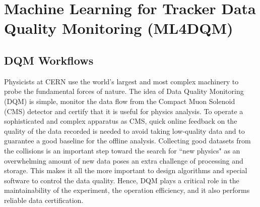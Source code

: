 \chapter{Machine Learning for Tracker Data Quality Monitoring (ML4DQM) \label{ch:DQM}}

\section{DQM Workflows}
Physicists at CERN use the world’s largest and most complex machinery to probe the fundamental forces of nature.
The idea of Data Quality Monitoring (DQM) is simple, monitor the data flow from the Compact Muon Solenoid (CMS) detector and certify that it is useful for physics analysis.
To operate a sophisticated and complex apparatus as CMS, quick online feedback on the quality of the data recorded is needed to avoid taking low-quality data and to guarantee a good baseline for the offline analysis. Collecting good datasets from the collisions is an important step toward the search for ``new physics" as an overwhelming amount of new data poses an extra challenge of processing and storage.
This makes it all the more important to design algorithms and special software to control the data quality. Hence, DQM plays a critical role in the maintainability of the experiment, the operation efficiency, and it also performs reliable data certification\cite{refId0}.



